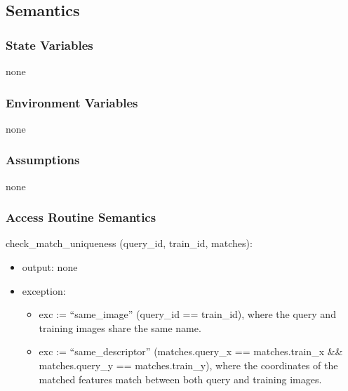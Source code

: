 \documentclass[12pt, titlepage]{article}
\begin{document}
\subsection{Semantics}

\subsubsection{State Variables}
none

\subsubsection{Environment Variables}
none


\subsubsection{Assumptions}
none

\subsubsection{Access Routine Semantics}

\noindent check\_match\_uniqueness (query\_id, train\_id, matches):
\begin{itemize}
  \item output: none 
  \item exception:
  \begin{itemize}
    \item exc := ``same\_image'' \textbar{} (query\_id == train\_id), where the query and training images share the same name.
    \item exc := ``same\_descriptor'' \textbar{} (matches.query\_x == matches.train\_x \&\& matches.query\_y == matches.train\_y), where the coordinates of the matched features match between both query and training images.
  \end{itemize}
\end{itemize}
\end{document}
